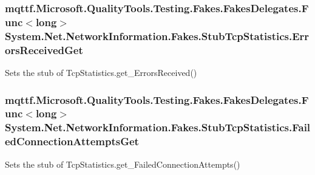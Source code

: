 \hypertarget{class_system_1_1_net_1_1_network_information_1_1_fakes_1_1_stub_tcp_statistics_a8b5adf73ec169213925e6c7adbca2d8e}{
\subsubsection[{Errors\-Received\-Get}]{\setlength{\rightskip}{0pt plus 5cm}mqttf.\-Microsoft.\-Quality\-Tools.\-Testing.\-Fakes.\-Fakes\-Delegates.\-Func$<$long$>$ System.\-Net.\-Network\-Information.\-Fakes.\-Stub\-Tcp\-Statistics.\-Errors\-Received\-Get}}\label{class_system_1_1_net_1_1_network_information_1_1_fakes_1_1_stub_tcp_statistics_a8b5adf73ec169213925e6c7adbca2d8e}


Sets the stub of Tcp\-Statistics.\-get\-\_\-\-Errors\-Received()

\hypertarget{class_system_1_1_net_1_1_network_information_1_1_fakes_1_1_stub_tcp_statistics_ab3089660042d4c7191824c16d332f91f}{
\subsubsection[{Failed\-Connection\-Attempts\-Get}]{\setlength{\rightskip}{0pt plus 5cm}mqttf.\-Microsoft.\-Quality\-Tools.\-Testing.\-Fakes.\-Fakes\-Delegates.\-Func$<$long$>$ System.\-Net.\-Network\-Information.\-Fakes.\-Stub\-Tcp\-Statistics.\-Failed\-Connection\-Attempts\-Get}}\label{class_system_1_1_net_1_1_network_information_1_1_fakes_1_1_stub_tcp_statistics_ab3089660042d4c7191824c16d332f91f}


Sets the stub of Tcp\-Statistics.\-get\-\_\-\-Failed\-Connection\-Attempts()


